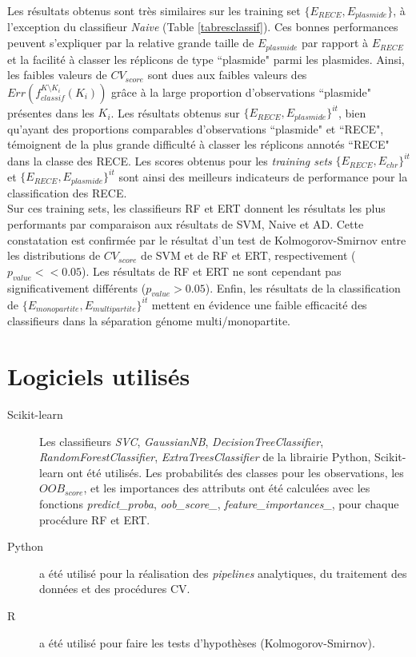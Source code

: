 	Les résultats obtenus sont très similaires sur les training set $\{E_{RECE},E_{plasmide}\}$, à l'exception du classifieur \textit{Naive} (Table \ref{tabresclassif}). Ces bonnes performances peuvent s'expliquer par la relative grande taille de $E_{plasmide}$ par rapport à $E_{RECE}$ et la facilité à classer les réplicons de type ``plasmide" parmi les plasmides. Ainsi, les faibles valeurs de $CV_{score}$ sont dues aux faibles valeurs des $Err(f_{classif}^{K\setminus K_{i}}(K_{i}))$ grâce à la large proportion d'observations ``plasmide" présentes dans les $K_{i}$. Les résultats obtenus sur $\{E_{RECE},E_{plasmide}\}^{it}$, bien qu'ayant des proportions comparables d'observations ``plasmide" et ``RECE", témoignent de la plus grande difficulté à classer les réplicons annotés ``RECE" dans la classe des RECE. Les scores obtenus pour les \textit{training sets}  $\{E_{RECE},E_{chr}\}^{it}$ et $\{E_{RECE},E_{plasmide}\}^{it}$ sont ainsi des meilleurs indicateurs de performance pour la classification des RECE. \\
	Sur ces training sets, les classifieurs RF et ERT donnent les résultats les plus performants par comparaison aux résultats de SVM, Naive et AD. Cette constatation est confirmée par le résultat d'un test de Kolmogorov-Smirnov entre les distributions de $CV_{score}$ de SVM et de RF et ERT, respectivement  ($p_{value} << 0.05$). Les résultats de RF et ERT ne sont cependant pas significativement différents ($p_{value} > 0.05$). Enfin, les résultats de la classification de $\{E_{monopartite},E_{multipartite}\}^{it}$ mettent en évidence une faible efficacité des classifieurs dans la séparation  génome multi/monopartite.
	  


\section{Logiciels utilisés}
\begin{description}
	  \item[Scikit-learn] Les classifieurs \textit{SVC}, \textit{GaussianNB}, \textit{DecisionTreeClassifier}, \textit{RandomForestClassifier}, \textit{ExtraTreesClassifier} de la librairie Python, Scikit-learn ont été utilisés. Les probabilités des classes pour les observations, les $OOB_{score}$, et les importances des attributs ont été calculées avec les fonctions \textit{predict\_proba}, \textit{oob\_score\_}, \textit{feature\_importances\_},  pour chaque procédure RF et ERT.
	  \item[Python] a été utilisé pour la réalisation des \textit{pipelines} analytiques, du traitement des données et des procédures CV.
	  \item[R] a été utilisé pour faire les tests d'hypothèses (Kolmogorov-Smirnov).
\end{description}
	  	  


